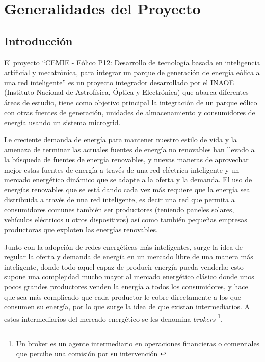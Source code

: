 \chapter{Generalidades del Proyecto}

\section*{Introducción}
El proyecto ``CEMIE - Eólico P12: Desarrollo de tecnología basada en inteligencia artificial y mecatrónica, para integrar un parque de generación de energía eólica a una red inteligente'' es un proyecto integrador desarrollado por el INAOE (Instituto Nacional de Astrofísica, Óptica y Electrónica) que abarca diferentes áreas de estudio, tiene como objetivo principal la integración de un parque eólico con otras fuentes de generación, unidades de almacenamiento y consumidores de energía usando un
sistema microgrid.

Le creciente demanda de energía para mantener nuestro estilo de vida y la amenaza de terminar las actuales fuentes de energía no renovables han llevado a la búsqueda de fuentes de energía renovables, y nuevas maneras de aprovechar mejor estas fuentes de energía a través de una red eléctrica inteligente y un mercado energético dinámico que se adapte a la oferta y la demanda.
El uso de energías renovables que se está dando cada vez más requiere que la energía sea distribuida a través de una red inteligente, es decir una red que permita a consumidores comunes también ser productores (teniendo paneles solares, vehículos eléctricos u otros dispositivos) así como también pequeñas empresas productoras que exploten las energías renovables.

Junto con la adopción de redes energéticas más inteligentes, surge la idea de regular la oferta y demanda de energía en un mercado libre de una manera más inteligente, donde todo aquel capaz de producir energía pueda venderla; esto supone una complejidad mucho mayor al mercado energético clásico donde unos pocos grandes productores venden la energía a todos los consumidores, y hace que sea más complicado que cada productor le cobre directamente a los que consumen su energía, por lo que surge la idea de que existan intermediarios. A estos intermediarios del mercado energético se les denomina \textit{brokers} \footnote{Un broker es un agente intermediario en operaciones financieras o comerciales que percibe una comisión por su intervención \cite{RAEDiccionario2014}}.

